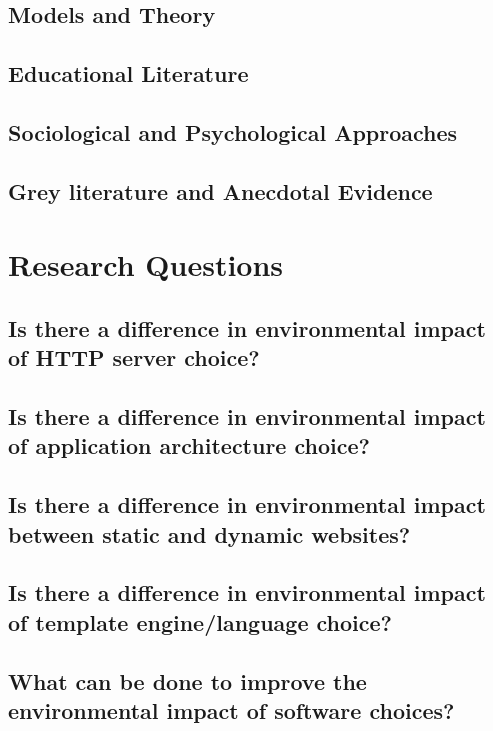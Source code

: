 \subsection{Models and Theory}

\subsection{Educational Literature}

\subsection{Sociological and Psychological Approaches}

\subsection{Grey literature and Anecdotal Evidence}

\section{Research Questions}
\label{section:research questions}


\subsection{Is there a difference in environmental impact of HTTP server choice?}


\subsection{Is there a difference in environmental impact of application architecture choice?}


\subsection{Is there a difference in environmental impact between static and dynamic websites?}


\subsection{Is there a difference in environmental impact of template engine/language choice?}


\subsection{What can be done to improve the environmental impact of software choices?}

